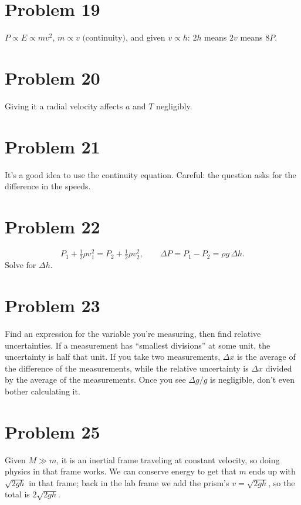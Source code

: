 \documentclass[11pt]{article}
\begin{document}
\section*{Problem 19}
$P\propto E\propto mv^2$, $m\propto v \text{ (continuity)}$, and given $v\propto h$: $2h$ means $2v$ means $8P$.

\section*{Problem 20}
Giving it a radial velocity affects $a$ and $T$ negligibly.

\section*{Problem 21}
It’s a good idea to use the continuity equation. Careful: the question asks for the difference in the speeds.

\section*{Problem 22}
\[
P_1+\tfrac12\rho v_1^2=P_2+\tfrac12\rho v_2^2,
\qquad
\Delta P=P_1-P_2=\rho g\,\Delta h.
\]
Solve for $\Delta h$.

\section*{Problem 23}
Find an expression for the variable you’re measuring, then find relative uncertainties.
If a measurement has ``smallest divisions'' at some unit, the uncertainty is half that unit.
If you take two measurements, $\Delta x$ is the average of the difference of the measurements, while the relative uncertainty is $\Delta x$ divided by the average of the measurements.
Once you see $\Delta g/g$ is negligible, don’t even bother calculating it.

\section*{Problem 25}
Given $M\gg m$, it is an inertial frame traveling at constant velocity, so doing physics in that frame works.
We can conserve energy to get that $m$ ends up with $\sqrt{2gh}$ in that frame; back in the lab frame we add the prism’s $v=\sqrt{2gh}$, so the total is $2\sqrt{2gh}$.
\end{document}
